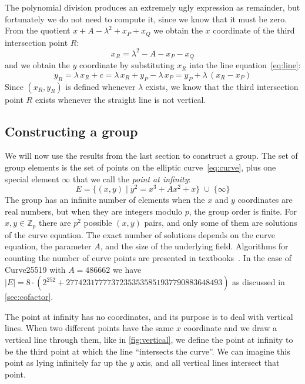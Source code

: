 \documentclass{article}
\begin{document}
The polynomial division produces an extremely ugly expression as remainder, but fortunately we do not need to compute it, since we know that it must be zero.
From the quotient $x + A - \lambda^2 + x_P + x_Q$ we obtain the $x$ coordinate of the third intersection point $R$:
\begin{equation}
x_R = \lambda^2 - A - x_P - x_Q \label{eq:xR}
\end{equation}
and we obtain the $y$ coordinate by substituting $x_R$ into the line equation~\eqref{eq:line}:
\begin{equation}
y_R = \lambda\,x_R + c = \lambda\,x_R + y_P - \lambda\,x_P = y_P + \lambda\,(x_R - x_P) \label{eq:yR}
\end{equation}
Since $(x_R, y_R)$ is defined whenever $\lambda$ exists, we know that the third intersection point $R$ exists whenever the straight line is not vertical.

\subsection{Constructing a group}\label{sec:group-construction}

We will now use the results from the last section to construct a group.
The set of group elements is the set of points on the elliptic curve~\eqref{eq:curve}, plus one special element $\infty$ that we call the \emph{point at infinity}:
\begin{equation}
E = \{(x,y) \mid y^2 = x^3 + A x^2 + x\} \;\cup\; \{\infty\}
\end{equation}
The group has an infinite number of elements when the $x$ and $y$ coordinates are real numbers, but when they are integers modulo $p$, the group order is finite.
For $x, y \in \mathbb{Z}_p$ there are $p^2$ possible $(x, y)$ pairs, and only some of them are solutions of the curve equation.
The exact number of solutions depends on the curve equation, the parameter $A$, and the size of the underlying field.
Algorithms for counting the number of curve points are presented in textbooks~\cite{Blake:1999,Cohen:2006}.
In the case of Curve25519 with $A = 486662$ we have $|E| = 8 \cdot (2^{252} + 27742317777372353535851937790883648493)$ as discussed in \autoref{sec:cofactor}.

The point at infinity has no coordinates, and its purpose is to deal with vertical lines.
When two different points have the same $x$ coordinate and we draw a vertical line through them, like in \autoref{fig:vertical}, we define the point at infinity to be the third point at which the line ``intersects the curve''.
We can imagine this point as lying infinitely far up the $y$ axis, and all vertical lines intersect that point.
\end{document}
